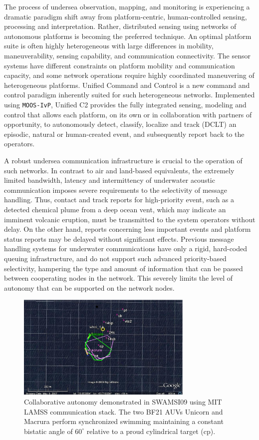 \documentclass[11pt, letterpaper, oneside]{memoir}
\begin{document}
The process of undersea observation, mapping, and monitoring is experiencing a dramatic
paradigm shift away from platform-centric, human-controlled sensing,
processing and interpretation. Rather, distributed sensing
using networks of autonomous platforms is becoming the preferred technique.
An optimal platform suite is often highly heterogeneous with large differences in mobility,
maneuverability, sensing capability, and communication connectivity.  The
sensor systems have different constraints on platform mobility and
communication capacity, and some network operations require highly
coordinated maneuvering of heterogeneous platforms. Unified Command and Control \cite{unified_c2} is a new command and control paradigm inherently suited for such heterogeneous networks. Implemented using
\verb|MOOS-IvP|, Unified C2 provides the fully integrated sensing,
modeling and control that allows each platform, on its own or in
collaboration with partners of opportunity, to autonomously detect,
classify, localize and track (DCLT) an episodic, natural or human-created event, and
subsequently report back to the operators.

A robust undersea communication infrastructure is crucial to the
operation of such networks. In contrast to air and land-based
equivalents, the extremely limited bandwidth, latency and
intermittency of underwater acoustic communication imposes severe
requirements to the selectivity of message handling. Thus, contact and
track reports for high-priority event, such as a detected chemical
plume from a deep ocean vent,  which may indicate an imminent volcanic
eruption, must be transmitted to the system operators without delay. On the
other hand, reports concerning less important events and platform status 
reports may be delayed without significant effects.
Previous message handling systems for underwater communications have only a
rigid, hard-coded queuing infrastructure, and do not support such
advanced priority-based selectivity, hampering the type and
amount of information that can be passed between cooperating nodes in
the network. This severely limits the level of autonomy that can be
supported on the network nodes.

\begin{figure}[tp]
  \centering 
  \includegraphics[width=0.75\textwidth]{bistatic3.eps}
\caption{ Collaborative autonomy demonstrated in SWAMSI09 using MIT
  LAMSS communication stack. The two BF21 AUVs Unicorn and Macrura
  perform synchronized swimming maintaining a constant bistatic angle
  of $60^{\circ}$ relative to a proud cylindrical target
  (cp). \label{bistatic3}}
\end{figure}
\end{document}
